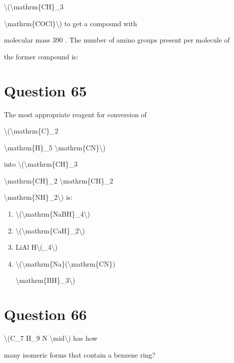 \documentclass{article}
\begin{document}
\textbackslash(\textbackslash mathrm\{CH\}\_3

\textbackslash mathrm\{COCl\}\textbackslash) to get a compound with

molecular mass 390 . The number of amino groups present per molecule of

the former compound is:


\begin{enumerate}[label=(\alph*)]
\end{enumerate}
\newpage
\section*{Question 65}
The most appropriate reagent for conversion of

\textbackslash(\textbackslash mathrm\{C\}\_2

\textbackslash mathrm\{H\}\_5 \textbackslash mathrm\{CN\}\textbackslash)

into \textbackslash(\textbackslash mathrm\{CH\}\_3

\textbackslash mathrm\{CH\}\_2 \textbackslash mathrm\{CH\}\_2

\textbackslash mathrm\{NH\}\_2\textbackslash) is:


\begin{enumerate}[label=(\alph*)]
\item \textbackslash(\textbackslash mathrm\{NaBH\}\_4\textbackslash)


\item \textbackslash(\textbackslash mathrm\{CaH\}\_2\textbackslash)


\item LiAl H\textbackslash(\_4\textbackslash)


\item \textbackslash(\textbackslash mathrm\{Na\}(\textbackslash mathrm\{CN\})

\textbackslash mathrm\{BH\}\_3\textbackslash)


\end{enumerate}
\newpage
\section*{Question 66}
\textbackslash(C\_7 H\_9 N \textbackslash mid\textbackslash) has how

many isomeric forms that contain a benzene ring?


\begin{enumerate}[label=(\alph*)]
\end{enumerate}
\newpage
\end{document}

